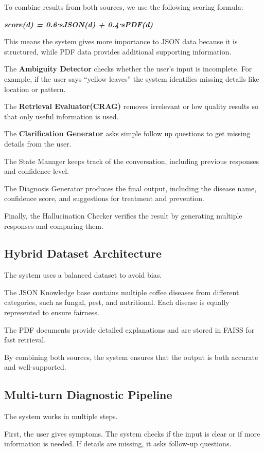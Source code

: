 \documentclass[conference]{IEEEtran}
\begin{document}
To combine results from both sources, we use the following scoring formula:

\textit{\textbf{score(d) = 0.6⋅sJSON(d) + 0.4⋅sPDF(d)}}

This means the system gives more importance to JSON data because it is structured, while PDF data provides additional supporting information.

The \textbf{Ambiguity Detector} checks whether the user’s input is incomplete. For example, if the user says “yellow leaves” the system identifies missing details like location or pattern.

The \textbf{Retrieval Evaluator(CRAG)} removes irrelevant or low quality results so that only useful information is used.

The \textbf{Clarification Generator} asks simple follow up questions to get missing details from the user.

The State Manager keeps track of the conversation, including previous responses and confidence level.

The Diagnosis Generator produces the final output, including the disease name, confidence score, and suggestions for treatment and prevention.

Finally, the Hallucination Checker verifies the result by generating multiple responses and comparing them.

\subsection{Hybrid Dataset Architecture}

The system uses a balanced dataset to avoid bias.

The JSON Knowledge base contains multiple coffee diseases from different categories, such as fungal, pest, and nutritional. Each disease is equally represented to ensure fairness.

The PDF documents provide detailed explanations and are stored in FAISS for fast retrieval.

By combining both sources, the system ensures that the output is both accurate and well-supported.

\subsection{Multi-turn Diagnostic Pipeline}

The system works in multiple steps.

First, the user gives symptoms. The system checks if the input is clear or if more information is needed. If details are missing, it asks follow-up questions.
\end{document}
